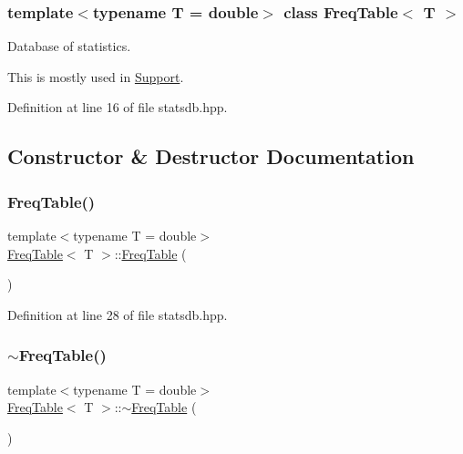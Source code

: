 \subsubsection*{template$<$typename T = double$>$\newline
class Freq\+Table$<$ T $>$}

Database of statistics. 

This is mostly used in {\ttfamily \hyperlink{class_support}{Support}}. 

Definition at line 16 of file statsdb.\+hpp.



\subsection{Constructor \& Destructor Documentation}
\mbox{\label{class_freq_table_a2fdea53e35f9a301d7d1bbf6b7da5f41}} 
\subsubsection{\texorpdfstring{Freq\+Table()}{FreqTable()}}
{\footnotesize\ttfamily template$<$typename T = double$>$ \\
\hyperlink{class_freq_table}{Freq\+Table}$<$ T $>$\+::\hyperlink{class_freq_table}{Freq\+Table} (\begin{DoxyParamCaption}{ }\end{DoxyParamCaption})\hspace{0.3cm}{\ttfamily [inline]}}



Definition at line 28 of file statsdb.\+hpp.

\mbox{\label{class_freq_table_a7ed627807a61c484243636137609abcd}} 
\subsubsection{\texorpdfstring{$\sim$\+Freq\+Table()}{~FreqTable()}}
{\footnotesize\ttfamily template$<$typename T = double$>$ \\
\hyperlink{class_freq_table}{Freq\+Table}$<$ T $>$\+::$\sim$\hyperlink{class_freq_table}{Freq\+Table} (\begin{DoxyParamCaption}{ }\end{DoxyParamCaption})\hspace{0.3cm}{\ttfamily [inline]}}



